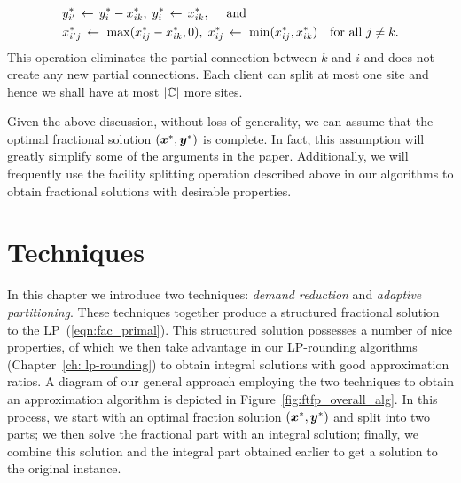 \documentclass[oneside,final]{ucr}
\def\dsp{\def\baselinestretch{2.0}\large\normalsize}
\def\ssp{\def\baselinestretch{1.0}\large\normalsize}
\begin{document}
\ssp
\begin{align*}
  &y^\ast_{i'} \;{\,\leftarrow\,}\; y^\ast_i - x^\ast_{ik},\;   y^\ast_{i} \;{\,\leftarrow\,}\; x^\ast_{ik}, \quad \text{ and }\\
  &x^\ast_{i'j} \;{\,\leftarrow\,}\;\max( x^\ast_{ij} - x^\ast_{ik}, 0 ),\;	 x^\ast_{ij} \;{\,\leftarrow\,}\; \min( x^\ast_{ij} , x^\ast_{ik}) 
			\quad	\textrm{for all}\ j \neq k.
\end{align*}
\dsp
This operation eliminates the partial connection between $k$
and $i$ and does not create any new partial
connections. Each client can split at most one site and
hence we shall have at most $|\mathbb{C}|$ more sites.

Given the above discussion, without loss of generality, we
can assume that the optimal fractional solution $(\boldsymbol{x}^\ast,
\boldsymbol{y}^\ast)$ is complete. In fact, this assumption will
greatly simplify some of the arguments in the
paper. Additionally, we will frequently use the facility
splitting operation described above in our algorithms to
obtain fractional solutions with desirable properties.

\chapter{Techniques} \label{ch: techniques} 

In this chapter we introduce two techniques: \emph{demand
  reduction} and \emph{adaptive partitioning}. These
techniques together produce a structured fractional solution
to the LP~(\ref{eqn:fac_primal}). This structured solution
possesses a number of nice properties, of which we then take
advantage in our LP-rounding algorithms (Chapter~\ref{ch:
  lp-rounding}) to obtain integral solutions with good
approximation ratios. A diagram of our general approach
employing the two techniques to obtain an approximation
algorithm is depicted in
Figure~\ref{fig:ftfp_overall_alg}. In this process, we start
with an optimal fraction solution $(\boldsymbol{x}^\ast, \boldsymbol{y}^\ast)$
and split into two parts; we then solve the fractional part
with an integral solution; finally, we combine this solution
and the integral part obtained earlier to get a solution to
the original instance.
\end{document}
